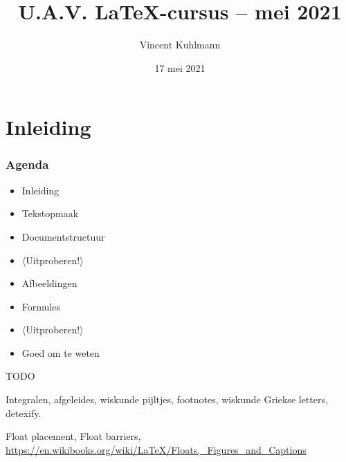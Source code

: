 

\title{U.A.V. \LaTeX{}-cursus -- mei 2021}
\author{Vincent Kuhlmann}
\date{17 mei 2021}



\section{Inleiding}

\begin{frame}
	\titlepage
	\centering
\end{frame}


\begin{frame}
	\frametitle{Agenda}
	
	\begin{itemize}
		\item Inleiding
		\item Tekstopmaak
		\item Documentstructuur
		\item $ \langle $Uitproberen!$ \rangle $
		\item Afbeeldingen
		\item Formules
		\item $ \mathbf\langle $Uitproberen!$ \rangle $
		\item Goed om te weten
	\end{itemize}
\end{frame}

\begin{frame}
	TODO
	
	Integralen, afgeleides, wiskunde pijltjes, footnotes, wiskunde Griekse letters, detexify.

	Float placement, Float barriers, \url{https://en.wikibooks.org/wiki/LaTeX/Floats,_Figures_and_Captions}
\end{frame}













